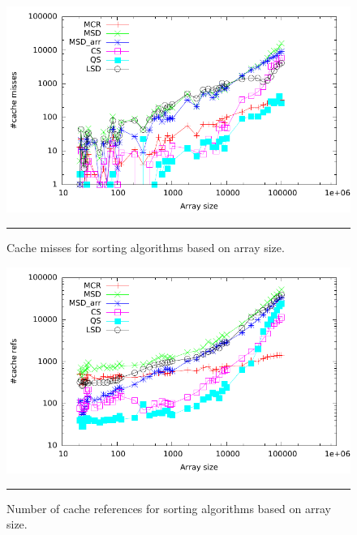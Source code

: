 \begin{figure}[htbp]
	\centering
		\includegraphics[width=\textwidth]{./Figures/Project2b/Cache_misses.pdf}
		\rule{35em}{0.5pt}
	\caption[Cache misses]{
	Cache misses for sorting algorithms based on array size.
	}
	\label{fig:Cache_misses_p2b}
\end{figure}




\begin{figure}[htbp]
	\centering
		\includegraphics[width=\textwidth]{./Figures/Project2b/Cache_refs.pdf}
		\rule{35em}{0.5pt}
	\caption[Cache refs]{
	Number of cache references for sorting algorithms based on array size.
	}
	\label{fig:Cache_refs_p2b}
\end{figure}



